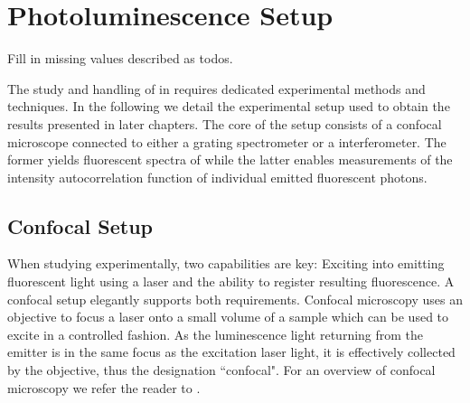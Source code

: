 
\chapter{Photoluminescence Setup}	\label{ch::pl_setup}

	\begin{remark}
		\item Fill in missing values described as todos.
	\end{remark}


	The study and handling of \sivs in \nds requires dedicated experimental methods and techniques. In the following we detail the experimental setup used to obtain the results presented in later chapters. The core of the setup consists of a confocal microscope connected to either a grating spectrometer or a \HBT interferometer. The former yields fluorescent spectra of \sivs while the latter enables measurements of the intensity autocorrelation function of individual emitted fluorescent photons.

	\section{Confocal Setup} \label{sec::confocal}

		When studying \sivs experimentally, two capabilities are key: Exciting \sivs into emitting fluorescent light using a laser and the ability to register resulting \siv fluorescence. A confocal setup elegantly supports both requirements. Confocal microscopy uses an objective to focus a laser onto a small volume of a sample which can be used to excite \sivs in a controlled fashion. As the luminescence light returning from the emitter is in the same focus as the excitation laser light, it is effectively collected by the objective, thus the designation ``confocal". For an overview of confocal microscopy we refer the reader to \cite{janine::237}.

